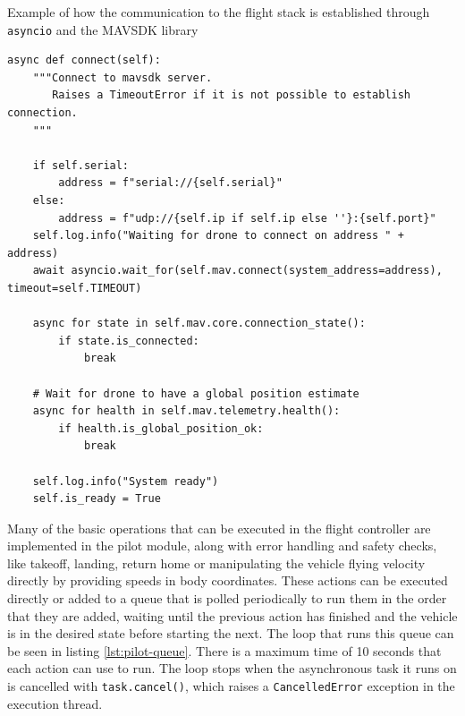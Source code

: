 \begin{listing}[h!]
    \caption{Example of how the communication to the flight stack is established through \texttt{asyncio} and the MAVSDK library}{}
    \label{lst:pilot-connect}
    \begin{verbatim}
async def connect(self):
    """Connect to mavsdk server.
       Raises a TimeoutError if it is not possible to establish connection.
    """
    
    if self.serial:
        address = f"serial://{self.serial}"
    else:
        address = f"udp://{self.ip if self.ip else ''}:{self.port}"
    self.log.info("Waiting for drone to connect on address " + address)
    await asyncio.wait_for(self.mav.connect(system_address=address), timeout=self.TIMEOUT)

    async for state in self.mav.core.connection_state():
        if state.is_connected:
            break

    # Wait for drone to have a global position estimate
    async for health in self.mav.telemetry.health():
        if health.is_global_position_ok:
            break
        
    self.log.info("System ready")
    self.is_ready = True
    \end{verbatim}
\end{listing}

Many of the basic operations that can be executed in the flight controller are implemented in the pilot module, along with error handling and safety checks, like takeoff, landing, return home or manipulating the vehicle flying velocity directly by providing speeds in body coordinates.
These actions can be executed directly or added to a queue that is polled periodically to run them in the order that they are added, waiting until the previous action has finished and the vehicle is in the desired state before starting the next.
The loop that runs this queue can be seen in listing \ref{lst:pilot-queue}.
There is a maximum time of 10 seconds that each action can use to run.
The loop stops when the asynchronous task it runs on is cancelled with \texttt{task.cancel()}, which raises a \texttt{CancelledError} exception in the execution thread.

